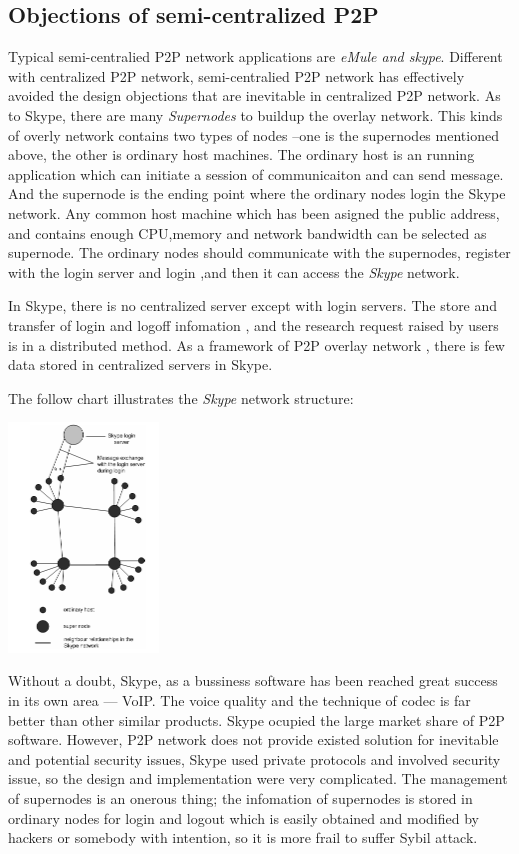 \subsection{Objections of semi-centralized P2P}
{
Typical semi-centralied P2P network applications are \emph{eMule\cite{eMuleProtocolSpecification} and skype\cite{SkypeTelephonyProtocol}}.
Different with centralized P2P network, semi-centralied P2P network has effectively avoided the design objections that are inevitable in centralized P2P network.
As to Skype, there are many \emph{Supernodes} to buildup the overlay network. This kinds of overly network contains two types of nodes --one is the supernodes mentioned above, the other is ordinary host machines.
The ordinary host is an running application which can initiate a session of communicaiton and can send message.
And the supernode is the ending point where the ordinary nodes login the Skype network.
Any common host machine which has been asigned the public address, and contains enough CPU,memory and network bandwidth can be selected as supernode. 
The ordinary nodes should communicate with the supernodes, register with the login server and login ,and then it can access the \emph{Skype} network.

In Skype, there is no centralized server except with login servers.
The store and transfer of login and logoff infomation , and the research request raised by users is in a distributed method. As a framework of P2P overlay network , there is few data stored in centralized servers in Skype.

The follow chart illustrates the \emph{Skype} network structure:
\begin{center}
\includegraphics[width=4cm]{data/skypestructure.png}
\end{center}

Without a doubt, Skype, as a bussiness software has been reached great success in its own area --- VoIP.
The voice quality and the technique of codec is far better than other similar products.
Skype ocupied the large market share of P2P software.
However, P2P network does not provide existed solution for inevitable and potential security issues, Skype used private protocols and involved security issue, so the design and implementation were very complicated.
The management of supernodes is an onerous thing; the infomation of supernodes is stored in ordinary nodes for login and logout which is easily obtained and modified by hackers or somebody with intention, so it is more frail to suffer Sybil attack.

}

